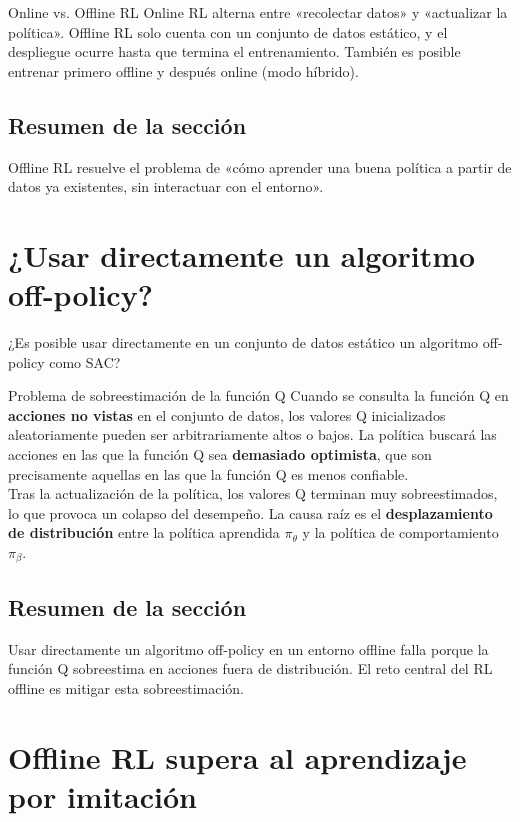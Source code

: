 \documentclass[a4paper]{article}
\begin{document}
\begin{knowledgebox}{Online vs. Offline RL}
Online RL alterna entre «recolectar datos» y «actualizar la política». Offline RL solo cuenta con un conjunto de datos estático, y el despliegue ocurre hasta que termina el entrenamiento. También es posible entrenar primero offline y después online (modo híbrido).
\end{knowledgebox}

\subsection{Resumen de la sección}

Offline RL resuelve el problema de «cómo aprender una buena política a partir de datos ya existentes, sin interactuar con el entorno».

\section{¿Usar directamente un algoritmo off-policy?}

¿Es posible usar directamente en un conjunto de datos estático un algoritmo off-policy como SAC?

\begin{warningbox}{Problema de sobreestimación de la función Q}
Cuando se consulta la función Q en \textbf{acciones no vistas} en el conjunto de datos, los valores Q inicializados aleatoriamente pueden ser arbitrariamente altos o bajos. La política buscará las acciones en las que la función Q sea \textbf{demasiado optimista}, que son precisamente aquellas en las que la función Q es menos confiable.
\\[6pt]
Tras la actualización de la política, los valores Q terminan muy sobreestimados, lo que provoca un colapso del desempeño. La causa raíz es el \textbf{desplazamiento de distribución} entre la política aprendida $\pi_\theta$ y la política de comportamiento $\pi_\beta$.
\end{warningbox}

\subsection{Resumen de la sección}

Usar directamente un algoritmo off-policy en un entorno offline falla porque la función Q sobreestima en acciones fuera de distribución. El reto central del RL offline es mitigar esta sobreestimación.
\section{Offline RL supera al aprendizaje por imitación}
\end{document}
